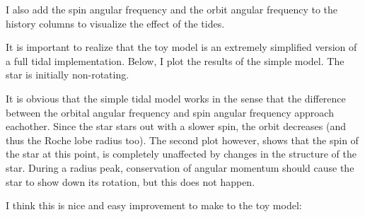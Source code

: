 \documentclass[a4paper,10pt]{article}
\begin{document}
I also add the spin angular frequency and the orbit angular frequency to the history columns to visualize the effect of the tides.

It is important to realize that the toy model is an extremely simplified version of a full tidal implementation. Below, I plot the results of the simple model. The star is initially non-rotating.
\begin{figure}[ht]
    \centering
\end{figure}

\begin{figure}[ht]
    \centering
\end{figure}

It is obvious that the simple tidal model works in the sense that the difference between the orbital angular frequency and spin angular frequency approach eachother. Since the star stars out with a slower spin, the orbit decreases (and thus the Roche lobe radius too). The second plot however, shows that the spin of the star at this point, is completely unaffected by changes in the structure of the star. During a radius peak, conservation of angular momentum should cause the star to show down its rotation, but this does not happen.

I think this is nice and easy improvement to make to the toy model:
\end{document}
